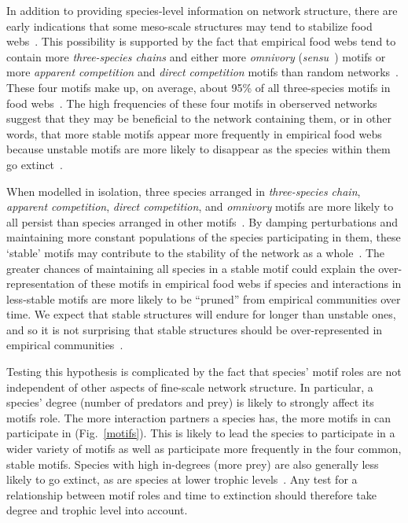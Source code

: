 \documentclass[12pt]{article}
\begin{document}
  
    In addition to providing species-level information on network structure, there are early indications that some meso-scale structures may tend to stabilize food webs~\citep{Prill2005,Borrelli2015,Monteiro2016}. 
    This possibility is supported by the fact that empirical food webs tend to contain more \emph{three-species chains} and either more \emph{omnivory} (\emph{sensu}~\citealp[]{Thompson2007b}) motifs or more \emph{apparent competition} and \emph{direct competition} motifs than random networks~\citep{Stouffer2007}. 
    These four motifs make up, on average, about 95\% of all three-species motifs in food webs~\citep{Stouffer2010b}. 
    The high frequencies of these four motifs in oberserved networks suggest that they may be beneficial to the network containing them, or in other words, that more stable motifs appear more frequently in empirical food webs because unstable motifs are more likely to disappear as the species within them go extinct~\citep{Borrelli2015,Borrelli2015a}.

  When modelled in isolation, three species arranged in \emph{three-species chain}, \emph{apparent competition}, \emph{direct competition}, and \emph{omnivory} motifs are more likely to all persist than species arranged in other motifs~\citep{Borrelli2015a}.
  By damping perturbations and maintaining more constant populations of the species participating in them, these `stable' motifs may contribute to the stability of the network as a whole~\citep{Borrelli2015a}. 
    The greater chances of maintaining all species in a stable motif could explain the over-representation of these motifs in empirical food webs if species and interactions in less-stable motifs are more likely to be ``pruned'' from empirical communities over time. We expect that stable structures will endure for longer than unstable ones, and so it is not surprising that stable structures should be over-represented in empirical communities~\citep{Borrelli2015}.


    Testing this hypothesis is complicated by the fact that species' motif roles are not independent of other aspects of fine-scale network structure. 
    In particular, a species' degree (number of predators and prey) is likely to strongly affect its motifs role.
    The more interaction partners a species has, the more motifs in can participate in (Fig.~\ref{motifs}).
    This is likely to lead the species to participate in a wider variety of motifs as well as participate more frequently in the four common, stable motifs.
    Species with high in-degrees (more prey) are also generally less likely to go extinct, as are species at lower trophic levels~\citep{Cirtwill2018FoodWebs}.
    Any test for a relationship between motif roles and time to extinction should therefore take degree and trophic level into account.
\end{document}
